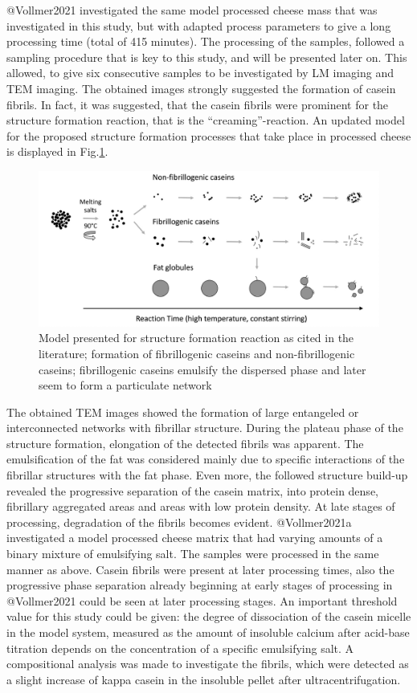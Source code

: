 \documentclass[
]{article}
\begin{document}
@Vollmer2021 investigated the same model processed cheese mass that was
investigated in this study, but with adapted process parameters to give
a long processing time (total of 415 minutes). The processing of the
samples, followed a sampling procedure that is key to this study, and
will be presented later on. This allowed, to give six consecutive
samples to be investigated by LM imaging and TEM imaging. The obtained
images strongly suggested the formation of casein fibrils. In fact, it
was suggested, that the casein fibrils were prominent for the structure
formation reaction, that is the ``creaming''-reaction. An updated model
for the proposed structure formation processes that take place in
processed cheese is displayed in Fig.\ref{fig:vol.mod}.

\begin{figure}
\includegraphics{images/str.form_Vollmer} \caption[Most recent model for aggregation phenomena during the creaming reaction]{Model presented for structure formation reaction as cited in the literature; formation of fibrillogenic caseins and non-fibrillogenic caseins; fibrillogenic caseins emulsify the dispersed phase and later seem to form a particulate network}\label{fig:vol.mod}
\end{figure}

The obtained TEM images showed the formation of large entangeled or
interconnected networks with fibrillar structure. During the plateau
phase of the structure formation, elongation of the detected fibrils was
apparent. The emulsification of the fat was considered mainly due to
specific interactions of the fibrillar structures with the fat phase.
Even more, the followed structure build-up revealed the progressive
separation of the casein matrix, into protein dense, fibrillary
aggregated areas and areas with low protein density. At late stages of
processing, degradation of the fibrils becomes evident. @Vollmer2021a
investigated a model processed cheese matrix that had varying amounts of
a binary mixture of emulsifying salt. The samples were processed in the
same manner as above. Casein fibrils were present at later processing
times, also the progressive phase separation already beginning at early
stages of processing in @Vollmer2021 could be seen at later processing
stages. An important threshold value for this study could be given: the
degree of dissociation of the casein micelle in the model system,
measured as the amount of insoluble calcium after acid-base titration
depends on the concentration of a specific emulsifying salt. A
compositional analysis was made to investigate the fibrils, which were
detected as a slight increase of kappa casein in the insoluble pellet
after ultracentrifugation.
\end{document}
